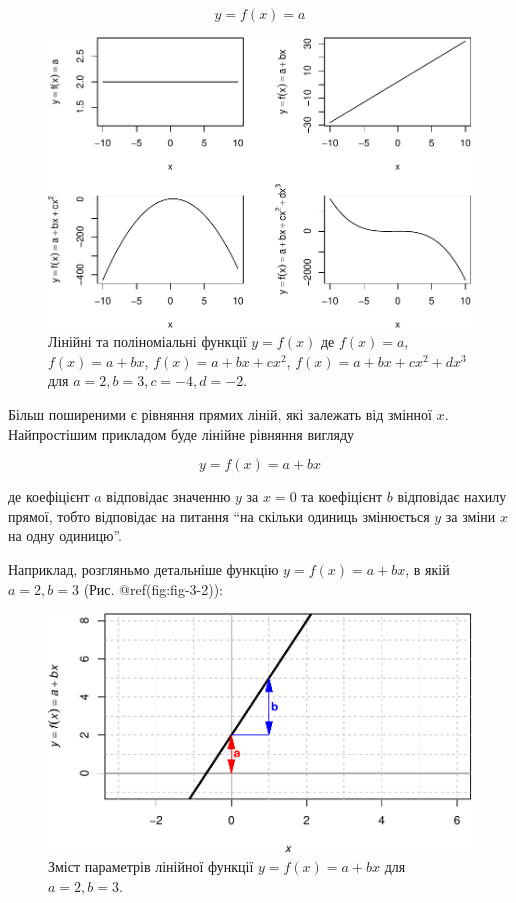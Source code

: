 \documentclass[
  11pt,
]{book}
\begin{document}
\[y = f(x) = a\]

\begin{figure}
\centering
\includegraphics{bookdown-demo_files/figure-latex/fig-3-1-1.pdf}
\caption{Лінійні та поліноміальні функції \(y = f(x)\) де \(f(x) = a\),
\(f(x) = a + bx\), \(f(x) = a + bx + cx^2\),
\(f(x) = a + bx + cx^2 + dx^3\) для \(a=2, b = 3, c = -4, d = -2\).}
\end{figure}

Більш поширеними є рівняння прямих ліній, які залежать від змінної
\(x\). Найпростішим прикладом буде лінійне рівняння вигляду

\[y = f(x) = a + bx\]

де коефіцієнт \(a\) відповідає значенню \(y\) за \(x = 0\) та коефіцієнт
\(b\) відповідає нахилу прямої, тобто відповідає на питання ``на скільки
одиниць змінюється \(y\) за зміни \(x\) на одну одиницю''.

Наприклад, розгляньмо детальніше функцію \(y = f(x) = a + bx\), в якій
\(a = 2, b = 3\) (Рис. @ref(fig:fig-3-2)):

\begin{figure}
\centering
\includegraphics{bookdown-demo_files/figure-latex/fig-3-2-1.pdf}
\caption{Зміст параметрів лінійної функції \(y = f(x) = a + bx\) для
\(a=2, b = 3\).}
\end{figure}
\end{document}
